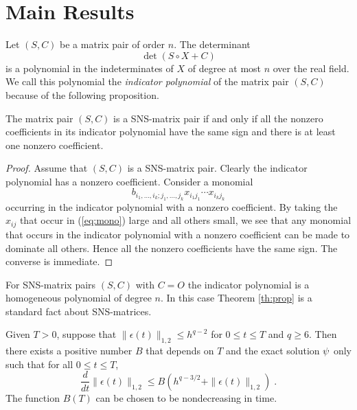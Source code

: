 \section{Main Results}

Let $(S,C)$ be a matrix pair of order $n$.  The determinant
\[\det (S\circ X+C)\] 
is a polynomial in the indeterminates of $X$ of degree at
most $n$ over the real field. We call this polynomial the
{\em indicator polynomial} of the matrix pair $(S,C)$
because of the following proposition.

\begin{theorem} 
\label{th:prop} 
The matrix pair $(S,C)$ is a {\rm SNS}-matrix pair if and
only if all the nonzero coefficients in its indicator
polynomial have the same sign and there is at least one
nonzero coefficient.
\end{theorem}

\begin{proof}
Assume that $(S,C)$ is a SNS-matrix pair.  Clearly the
indicator polynomial has a nonzero coefficient.  Consider a
monomial
\begin{equation} 
\label{eq:mono} 
b_{i_{1},\ldots,i_{k};j_{1},\ldots,j_{k}}x_{i_{1}j_{1}}\cdots
x_{i_{k}j_{k}}
\end{equation} 
occurring in the indicator polynomial with a nonzero
coefficient.  By taking the $x_{ij}$ that occur in
(\ref{eq:mono}) large and all others small, we see that any
monomial that occurs in the indicator polynomial with a
nonzero coefficient can be made to dominate all others.
Hence all the nonzero coefficients have the same sign. The
converse is immediate. \qquad\end{proof}


For SNS-matrix pairs $(S,C)$ with $C=O$ the indicator
polynomial is a homogeneous polynomial of degree $n$. In
this case Theorem \ref{th:prop} is a standard fact about
SNS-matrices.

\begin{lemma}[Stability]
\label{stability}
Given $T>0$, suppose that $\| \epsilon (t) \|_{1,2} \leq h^{q-2}$
for $0 \leq t \leq T$ and $q \geq 6$. 
Then there exists a positive number $B$ that depends on
$T$ and the exact solution $\psi$ only such that for all $0 \leq t \leq T$,
\begin{equation}
\label{Gron}
\frac {d}{dt} \| \epsilon (t) \| _{1,2}  \leq B
   ( h^{q-3/2} + \| \epsilon (t) \|_{1,2})\;.
\end{equation}
The function $B(T)$ can be chosen to be nondecreasing in time.
\end{lemma}

